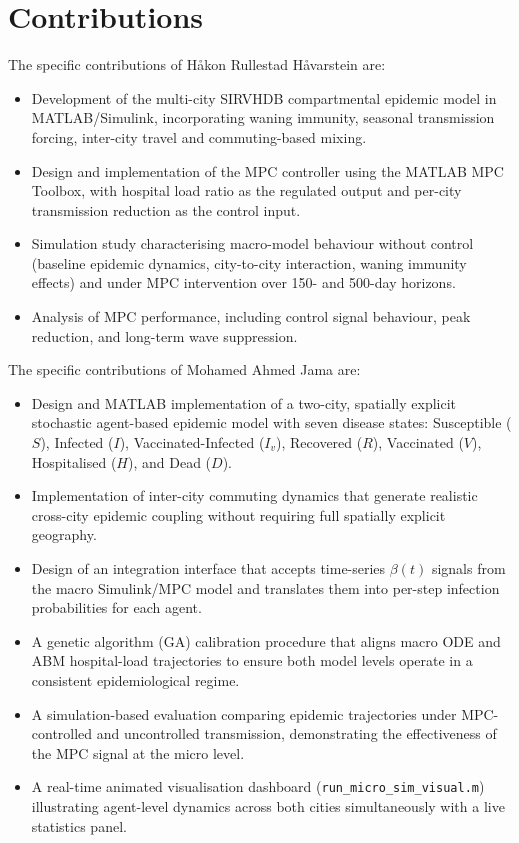 \section{Contributions}
\label{sec:contributions}

The specific contributions of H\aa{}kon Rullestad H\aa{}varstein are:
\begin{itemize}
  \item Development of the multi-city SIRVHDB compartmental epidemic model in MATLAB/Simulink, incorporating waning immunity, seasonal transmission forcing, inter-city travel and commuting-based mixing.
  \item Design and implementation of the MPC controller using the MATLAB MPC Toolbox, with hospital load ratio as the regulated output and per-city transmission reduction as the control input.
  \item Simulation study characterising macro-model behaviour without control (baseline epidemic dynamics, city-to-city interaction, waning immunity effects) and under MPC intervention over 150- and 500-day horizons.
  \item Analysis of MPC performance, including control signal behaviour, peak reduction, and long-term wave suppression.
\end{itemize}

The specific contributions of Mohamed Ahmed Jama are:
\begin{itemize}
  \item Design and MATLAB implementation of a two-city, spatially explicit stochastic agent-based epidemic model with seven disease states: Susceptible ($S$), Infected ($I$), Vaccinated-Infected ($I_v$), Recovered ($R$), Vaccinated ($V$), Hospitalised ($H$), and Dead ($D$).
  \item Implementation of inter-city commuting dynamics that generate realistic cross-city epidemic coupling without requiring full spatially explicit geography.
  \item Design of an integration interface that accepts time-series $\beta(t)$ signals from the macro Simulink/MPC model and translates them into per-step infection probabilities for each agent.
  \item A genetic algorithm (GA) calibration procedure that aligns macro ODE and ABM hospital-load trajectories to ensure both model levels operate in a consistent epidemiological regime.
  \item A simulation-based evaluation comparing epidemic trajectories under MPC-controlled and uncontrolled transmission, demonstrating the effectiveness of the MPC signal at the micro level.
  \item A real-time animated visualisation dashboard (\texttt{run\_micro\_sim\_visual.m}) illustrating agent-level dynamics across both cities simultaneously with a live statistics panel.
\end{itemize}

